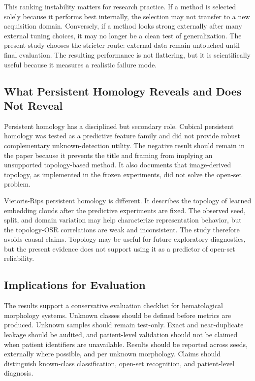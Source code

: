 This ranking instability matters for research practice. If a method is selected solely because it performs best internally, the selection may not transfer to a new acquisition domain. Conversely, if a method looks strong externally after many external tuning choices, it may no longer be a clean test of generalization. The present study chooses the stricter route: external data remain untouched until final evaluation. The resulting performance is not flattering, but it is scientifically useful because it measures a realistic failure mode.

\subsection{What Persistent Homology Reveals and Does Not Reveal}

Persistent homology has a disciplined but secondary role. Cubical persistent homology was tested as a predictive feature family and did not provide robust complementary unknown-detection utility. The negative result should remain in the paper because it prevents the title and framing from implying an unsupported topology-based method. It also documents that image-derived topology, as implemented in the frozen experiments, did not solve the open-set problem.

Vietoris-Rips persistent homology is different. It describes the topology of learned embedding clouds after the predictive experiments are fixed. The observed seed, split, and domain variation may help characterize representation behavior, but the topology-OSR correlations are weak and inconsistent. The study therefore avoids causal claims. Topology may be useful for future exploratory diagnostics, but the present evidence does not support using it as a predictor of open-set reliability.

\subsection{Implications for Evaluation}

The results support a conservative evaluation checklist for hematological morphology systems. Unknown classes should be defined before metrics are produced. Unknown samples should remain test-only. Exact and near-duplicate leakage should be audited, and patient-level validation should not be claimed when patient identifiers are unavailable. Results should be reported across seeds, externally where possible, and per unknown morphology. Claims should distinguish known-class classification, open-set recognition, and patient-level diagnosis.

